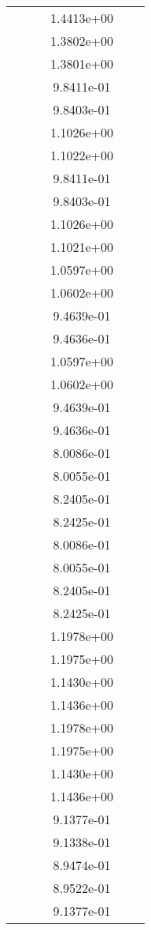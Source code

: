 \begin{xltabular}{\textwidth}{r|rS[table-format=1.3e+2]S[table-format=1.4e+2]S[table-format=1.4e+2]S[table-format=-1.5]}
&  &  & 1.4413e+00 & & \\
&  &  & 1.3802e+00 & & \\
&  &  & 1.3801e+00 & & \\
&  &  & 9.8411e-01 & & \\
&  &  & 9.8403e-01 & & \\
&  &  & 1.1026e+00 & & \\
&  &  & 1.1022e+00 & & \\
&  &  & 9.8411e-01 & & \\
&  &  & 9.8403e-01 & & \\
&  &  & 1.1026e+00 & & \\
&  &  & 1.1021e+00 & & \\
&  &  & 1.0597e+00 & & \\
&  &  & 1.0602e+00 & & \\
&  &  & 9.4639e-01 & & \\
&  &  & 9.4636e-01 & & \\
&  &  & 1.0597e+00 & & \\
&  &  & 1.0602e+00 & & \\
&  &  & 9.4639e-01 & & \\
&  &  & 9.4636e-01 & & \\
&  &  & 8.0086e-01 & & \\
&  &  & 8.0055e-01 & & \\
&  &  & 8.2405e-01 & & \\
&  &  & 8.2425e-01 & & \\
&  &  & 8.0086e-01 & & \\
&  &  & 8.0055e-01 & & \\
&  &  & 8.2405e-01 & & \\
&  &  & 8.2425e-01 & & \\
&  &  & 1.1978e+00 & & \\
&  &  & 1.1975e+00 & & \\
&  &  & 1.1430e+00 & & \\
&  &  & 1.1436e+00 & & \\
&  &  & 1.1978e+00 & & \\
&  &  & 1.1975e+00 & & \\
&  &  & 1.1430e+00 & & \\
&  &  & 1.1436e+00 & & \\
&  &  & 9.1377e-01 & & \\
&  &  & 9.1338e-01 & & \\
&  &  & 8.9474e-01 & & \\
&  &  & 8.9522e-01 & & \\
&  &  & 9.1377e-01 & & \\

\end{xltabular}
